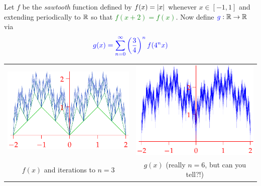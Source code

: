 \begin{exercises}{}
\begin{enumerate}
		Let $f$ be the \emph{sawtooth} function defined by \textcolor{Green}{$f(x)=\left| x\right|$} whenever $x\in[-1,1]$ and extending periodically to $\mathbb{R}$ so that \textcolor{Green}{$f(x+2)=f(x)$}. Now define $\textcolor{blue}{g}:\mathbb{R}\to\mathbb{R}$ via
  	\[
  		\textcolor{blue}{g(x)=\sum_{n=0}^\infty \left(\frac 34\right)^nf(4^nx)}
  	\]
  	\vspace{-30pt}
	  \begin{center}
		  \begin{tabular}{c@{\qquad}c}
			  \includegraphics[scale=0.95]{sawtooth}
			  &
			  \includegraphics[scale=0.95]{sawtooth2}\\
			  $f(x)$ and iterations to $n=3$
			  &
			  $g(x)$ (really $n=6$, but can you tell?!)
		  \end{tabular}
	  \end{center}
  

\end{enumerate}
\end{exercises}
